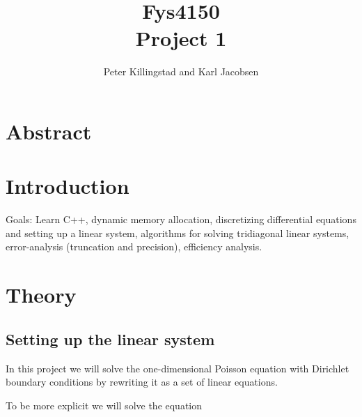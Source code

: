 \documentclass{article}
\title{Fys4150\\Project 1\\ }
\author{Peter Killingstad and Karl Jacobsen}
\begin{document}
	
\maketitle

\tableofcontents

\pagebreak
\section{Abstract}

\section{Introduction}
Goals: Learn C++, dynamic memory allocation, discretizing differential equations and setting up a linear system, algorithms for solving tridiagonal linear systems, error-analysis (truncation and precision), efficiency analysis.

\section{Theory}


\subsection{Setting up the linear system}
In this project we will solve the one-dimensional Poisson equation
with Dirichlet boundary conditions by rewriting it as a set of linear equations.


To be more explicit we will solve the equation
\end{document}
